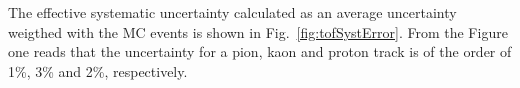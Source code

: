 The effective systematic uncertainty calculated as an average uncertainty weigthed with the MC events is shown in Fig.~\ref{fig:tofSystError}. From the Figure one reads that the uncertainty for a pion, kaon and proton track is of the order of 1\%, 3\% and 2\%, respectively.

\begin{figure}[h]
\centering
\parbox{0.4725\textwidth}{
  \centering
  \begin{subfigure}[b]{\linewidth}
                \vspace{-6pt}
  \end{subfigure}
}%
\quad\quad%
\parbox{0.4725\textwidth}{
  \centering
  \begin{subfigure}[b]{\linewidth}
                \vspace{-6pt}

\end{subfigure}}
\end{figure}
